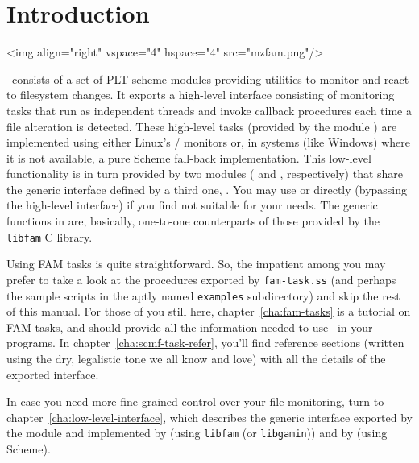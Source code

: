
\chapter{Introduction}
\label{cha:introduction}

\htmlonly
\rawhtml<img align="right" vspace="4" hspace="4" src="mzfam.png"/>\endrawhtml
\endhtmlonly

\MzFam\ consists of a set of PLT-scheme modules providing utilities to
monitor and react to filesystem changes. It exports a high-level
interface consisting of monitoring tasks that run as independent
threads and invoke callback procedures each time a file alteration is
detected. These high-level tasks (provided by the module
) are implemented using either Linux's
/
monitors or, in systems (like Windows) where it is not available, a
pure Scheme fall-back implementation. This low-level functionality is
in turn provided by two modules ( and ,
respectively) that share the generic interface defined by a third one,
. You may use  or  directly
(bypassing the high-level interface) if you find  not
suitable for your needs. The generic functions in  are,
basically, one-to-one counterparts of those provided by the
\texttt{libfam} C library.

Using FAM tasks is quite straightforward. So, the impatient among you
may prefer to take a look at the procedures exported by
\texttt{fam-task.ss} (and perhaps the sample scripts in the aptly
named \texttt{examples} subdirectory) and skip the rest of this
manual. For those of you still here, chapter~\ref{cha:fam-tasks} is a
tutorial on FAM tasks, and should provide all the information
needed to use \MzFam\ in your programs. In
chapter~\ref{cha:scmf-task-refer}, you'll find reference sections
(written using the dry, legalistic tone we all know and love) with all
the details of the exported  interface.

In case you need more fine-grained control over your file-monitoring,
turn to chapter~\ref{cha:low-level-interface}, which describes the
generic interface exported by the  module and
implemented by  (using \texttt{libfam} (or
\texttt{libgamin})) and by  (using Scheme).

